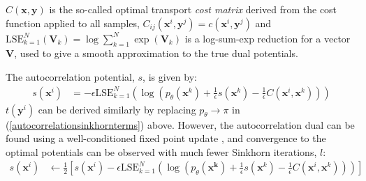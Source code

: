 $C(\mathbf{x}, \mathbf{y})$ is the so-called optimal transport \textit{cost matrix} derived from the cost function applied to all samples, $C_{ij}(\mathbf{x}^i, \mathbf{y}^j) = c(\mathbf{x}^i, \mathbf{y}^j)$ and $\text{LSE}_{k=1}^N(\mathbf{V}_k) = \log\sum\limits_{k=1}^N\exp(\mathbf{V}_k)$ is a log-sum-exp reduction for a vector $\mathbf{V}$, used to give a smooth approximation to the true dual potentials.

The autocorrelation potential, $s$, is given by:
\begin{align}
    s(\mathbf{x}^i) &= -\epsilon \text{LSE}_{k=1}^N\left(\log\left(p_\theta(\mathbf{\mathbf{x}}^k) + \frac{1}{\epsilon}s(\mathbf{x}^k) - \frac{1}{\epsilon} C(\mathbf{x}^i, \mathbf{x}^k)\right)\right) \label{autocorrelationsinkhornterms}
\end{align}
$t(\mathbf{y}^i)$ can be derived similarly by replacing $p_\theta \rightarrow \pi$ in (\ref{autocorrelationsinkhornterms}) above. However, the autocorrelation dual can be found using a well-conditioned fixed point update , and convergence to the optimal potentials can be observed with much fewer Sinkhorn iterations, $l$:
\begin{align}
    s(\mathbf{x}^i) &\leftarrow \frac{1}{2}\left[s(\mathbf{x}^i)-\epsilon \text{LSE}_{k=1}^N\left(\log\left(p_\theta(\mathbf{\mathbf{x}^k}) + \frac{1}{\epsilon}s(\mathbf{x}^k) - \frac{1}{\epsilon} C(\mathbf{x}^i, \mathbf{x}^k)\right)\right)\right] \label{autocorrelationsinkhorntermsupdate}
\end{align}

